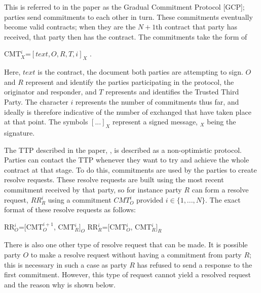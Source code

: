 \documentclass{l4proj}
\begin{document}
This is referred to in the paper as the Gradual Commitment Protocol [GCP]; parties send commitments to each other in turn. These commitments eventually become valid contracts; when they are the $N+1$th contract that party has received, that party then has the contract. The commitments take the form of\\

\centerline{CMT${_{X}^{i}}$=$[text, O, R, T, i]_X $ .}

Here, $text$ is the contract, the document both parties are attempting to sign. $O$ and $R$ represent and identify the parties participating in the protocol, the originator and responder, and $T$ represents and identifies the Trusted Third Party. The character $i$ represents the number of commitments thus far, and ideally is therefore indicative of the number of exchanged that have taken place at that point. The symbols $[...]_X$ represent a signed message, $_X$ being the signature.

The TTP described in the paper, \cite{ASW09}, is described as a non-optimistic protocol. Parties can contact the TTP whenever they want to try and achieve the whole contract at that stage. To do this, commitments are used by the parties to create resolve requests. These resolve requests are built using the most recent commitment received by that party, so for instance party $R$ can form a resolve request, $RR{_{R}^{i}}$ using a commitment $CMT{_{O}^i}$ provided $i \in \{1,...,N\}$. The exact format of these resolve requests as follows:\\

\centerline{RR${_{O}^{i}}$=$[$CMT${_{O}^{i+1}}$, CMT${_{R}^{i}}]_O$ \hspace{30mm}  RR${_{R}^{i}}$=$[$CMT${_{O}^{i}}$, CMT${_{R}^{i}}]_R$}

There is also one other type of resolve request that can be made. It is possible party $O$ to make a resolve request without having a commitment from party $R$; this is necessary in such a case as party $R$ has refused to send a response to the first commitment. However, this type of request cannot yield a resolved request and the reason why is shown below.
\end{document}
